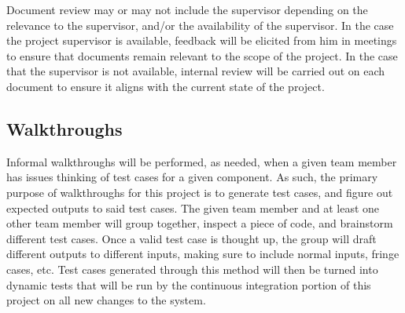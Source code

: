 \documentclass[12pt, titlepage]{article}
\begin{document}
\noindent Document review may or may not include the supervisor depending on the relevance to the supervisor, and/or the availability of the supervisor. In the case the project supervisor is available, feedback will be elicited from him in meetings to ensure that documents remain relevant to the scope of the project. In the case that the supervisor is not available, internal review will be carried out on each document to ensure it aligns with the current state of the project.

\subsection{Walkthroughs}

Informal walkthroughs will be performed, as needed, when a given team member has issues thinking of test cases for a given component. As such, the primary purpose of walkthroughs for this project is to generate test cases, and figure out expected outputs to said test cases. The given team member and at least one other team member will group together, inspect a piece of code, and brainstorm different test cases. Once a valid test case is thought up, the group will draft different outputs to different inputs, making sure to include normal inputs, fringe cases, etc. Test cases generated through this method will then be turned into dynamic tests that will be run by the continuous integration portion of this project on all new changes to the system.




\end{document}
